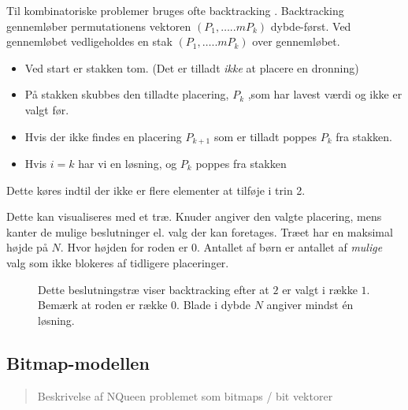 \documentclass[draft,a4paper,10pt]{article}
\begin{document}
Til kombinatoriske problemer bruges ofte backtracking . Backtracking gennemløber permutationens vektoren  $(P_1,\ldots..mP_k)$ dybde-først. Ved gennemløbet vedligeholdes en stak $(P_1,\ldots..mP_k)$ over gennemløbet.

\begin{itemize}
\item Ved start er stakken tom. (Det er tilladt \textit{ikke} at placere en dronning)
\item På stakken skubbes den tilladte placering, $P_k$ ,som har lavest værdi og ikke er valgt før.
\item Hvis der ikke findes en placering $P_{k+1}$ som er tilladt poppes $P_k$ fra stakken. 
\item Hvis $i=k$ har vi en løsning, og $P_k$ poppes fra stakken
\end{itemize}
Dette køres indtil der ikke er flere elementer at tilføje i trin 2.

Dette kan visualiseres med et træ. Knuder angiver den valgte placering, mens kanter de mulige beslutninger el. valg der kan foretages.  Træet har en maksimal højde på $N$. Hvor højden for roden er 0. Antallet af børn er antallet af \textit{mulige} valg som ikke blokeres af tidligere placeringer. 

\begin{figure}[!h]

\caption{
Dette beslutningstræ viser backtracking efter at $2$ er valgt i række $1$.
Bemærk at roden er række 0. Blade i dybde $N$ angiver mindst én løsning.}
\label{fig:tree}
\end{figure}


\subsection{Bitmap-modellen}\label{bitmapmodellen}
\begin{verse}
	Beskrivelse af NQueen problemet som bitmaps / bit vektorer
\end{verse}
\end{document}

